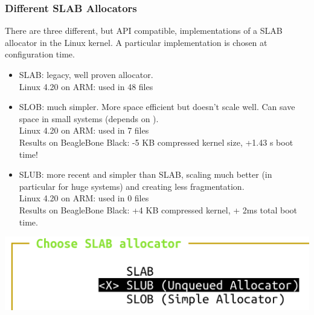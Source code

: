 \begin{frame}[fragile]
  \frametitle{Different SLAB Allocators}
  \small
  There are three different, but API compatible, implementations of
  a SLAB allocator in the Linux kernel. A particular implementation
  is chosen at configuration time.
  \begin{itemize}
  \item SLAB: legacy, well proven allocator.\\
        Linux 4.20 on ARM: used in 48  files
  \item SLOB: much simpler. More space efficient but doesn't scale
        well. Can save space in small systems (depends on
        ). \\
        Linux 4.20 on ARM: used in 7  files \\
        Results on BeagleBone Black: -5 KB compressed kernel size, +1.43 s boot time!
  \item SLUB: more recent and simpler than
        SLAB, scaling much better (in particular for huge systems) and
        creating less fragmentation.\\
        Linux 4.20 on ARM: used in 0  files \\
	Results on BeagleBone Black: +4 KB compressed kernel, + 2ms total boot time.
  \end{itemize}
  \begin{center}
    \includegraphics[height=0.2\textheight]{slides/kernel-driver-development-memory/slab-screenshot.png}
  \end{center}
\end{frame}

